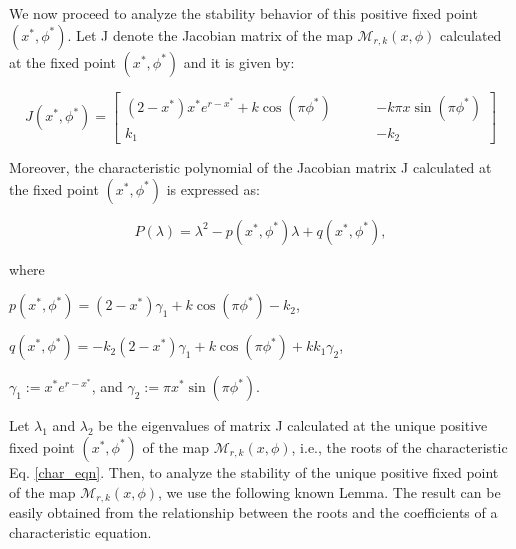 \documentclass{article}
\begin{document}
\vspace{0.2cm}

\noindent We now proceed to analyze the stability behavior of this positive fixed point $(x^*,\phi^*)$. Let J denote the Jacobian matrix of the map $\mathcal{M}_{r,k}(x,\phi)$
calculated at the fixed point $(x^*,\phi^*)$ and it is given by:

\[
J(x^*,\phi^*) = 
\begin{bmatrix}
(2-x^{*})x^{*}e^{r-x^{*}}+k \cos(\pi\phi^*) \hspace{1cm}&      -k{\pi}x  \sin(\pi\phi^*) \\
k_1 & -k_2
\end{bmatrix}
\]

\noindent Moreover, the characteristic polynomial of the Jacobian matrix J calculated at the fixed point $(x^*,\phi^*)$ is expressed as:  

  \begin{equation}\label{char_eqn}
   P(\lambda)= \lambda^2-p(x^*,\phi^*)\lambda+q(x^*,\phi^*),
\end{equation}

\noindent where

 $p(x^*,\phi^*)= (2-x^*)\gamma_1+k \cos(\pi\phi^*)-k_2$,
 
 $q(x^*,\phi^*)= -k_2(2-x^*)\gamma_1+k \cos(\pi\phi^*)+k{k_1}\gamma_2$,
 
 $\gamma_1 := x^*e^{r-x^*}$, and $\gamma_2 := {\pi}{x^*} \sin({\pi}{\phi^*}).$


\noindent

\noindent Let $\lambda_1$ and $\lambda_2$ be the eigenvalues of matrix J calculated at the unique positive fixed point $(x^*,\phi^*)$ of the map $\mathcal{M}_{r,k}(x,\phi)$, i.e., the roots of the characteristic Eq. \eqref{char_eqn}. Then, to analyze the stability of the unique positive fixed point of the map $\mathcal{M}_{r,k}(x,\phi)$, we use the following known Lemma. The result can be easily obtained from the relationship between the roots and the coefficients of a characteristic equation.
\end{document}
